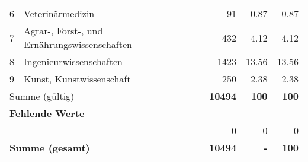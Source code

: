 \begin{longtable}{lXrrr}
     6 &
     \multicolumn{1}{X}{ Veterinärmedizin   } &


       \num{91} &
       \num[round-mode=places,round-precision=2]{0.87} &
         \num[round-mode=places,round-precision=2]{0.87} \\

     7 &
     \multicolumn{1}{X}{ Agrar-, Forst-, und Ernährungswissenschaften   } &


       \num{432} &
       \num[round-mode=places,round-precision=2]{4.12} &
         \num[round-mode=places,round-precision=2]{4.12} \\

     8 &
     \multicolumn{1}{X}{ Ingenieurwissenschaften   } &


       \num{1423} &
       \num[round-mode=places,round-precision=2]{13.56} &
         \num[round-mode=places,round-precision=2]{13.56} \\

     9 &
     \multicolumn{1}{X}{ Kunst, Kunstwissenschaft   } &


       \num{250} &
       \num[round-mode=places,round-precision=2]{2.38} &
         \num[round-mode=places,round-precision=2]{2.38} \\
     \midrule
     \multicolumn{2}{l}{Summe (gültig)} &
       \textbf{\num{10494}} &
     \textbf{\num{100}} &
       \textbf{\num[round-mode=places,round-precision=2]{100}} \\
     \multicolumn{5}{l}{\textbf{Fehlende Werte}}\\
      & & 0 & 0 & 0 \\
     \midrule
     \multicolumn{2}{l}{\textbf{Summe (gesamt)}} &
          \textbf{\num{10494}} &
        \textbf{-} &
        \textbf{\num{100}} \\
     \bottomrule
     \end{longtable}
     
